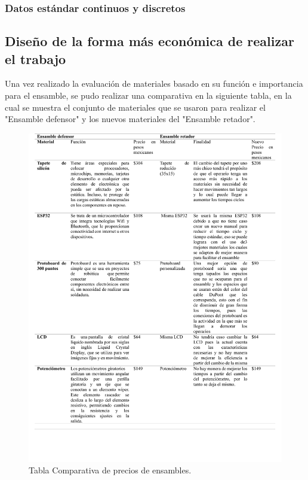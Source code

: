     \subsubsection{Datos estándar continuos y discretos}
    \subsection{Diseño de la forma más económica de realizar el trabajo}
    
    Una vez realizado la evaluación de materiales basado en su función e importancia para el ensamble, se pudo realizar una comparativa en la siguiente tabla, en la cual se muestra el conjunto de materiales que se usaron para realizar el "Ensamble defensor" y los nuevos materiales del "Ensamble retador".
    
    \begin{figure}[H]
        \centering
        \includegraphics[scale=0.181]{21/img/comparacionPrecios.pdf}
        \caption{Tabla Comparativa de precios de ensambles.}
        \label{fig:comparacionPrecios}
    \end{figure}
    
